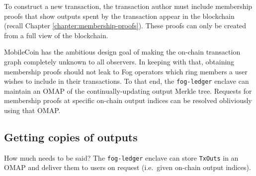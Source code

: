 To construct a new transaction, the transaction author must include membership proofs that show outputs spent by the transaction appear in the blockchain (recall Chapter \ref{chapter:membership-proofs}). These proofs can only be created from a full view of the blockchain.

MobileCoin has the ambitious design goal of making the on-chain transaction graph completely unknown to all observers. In keeping with that, obtaining membership proofs should not leak to Fog operators which ring members a user wishes to include in their transactions. To that end, the {\tt fog-ledger} enclave can maintain an OMAP of the continually-updating output Merkle tree. Requests for membership proofs at specific on-chain output indices can be resolved obliviously using that OMAP.


\subsection{Getting copies of outputs}
\label{subsec:fog-getting-copies-outputs}

How much needs to be said? The {\tt fog-ledger} enclave can store {\tt TxOuts} in an OMAP and deliver them to users on request (i.e.\ given on-chain output indices).
